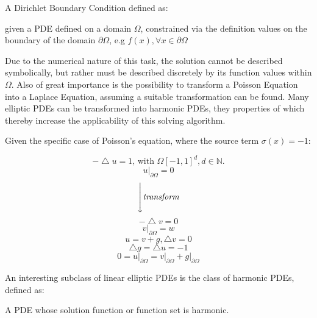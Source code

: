 A Dirichlet Boundary Condition defined as:
\begin{definition}
given a \Gls{PDE}
defined on a domain $\Omega$, constrained via the definition values on the
 boundary of the domain $\partial \Omega$, e.g $f(x), \forall  x \in \partial \Omega$
\end{definition}
Due to the numerical nature of this task, the solution cannot be described symbolically,
but rather must be described discretely by its function values within $\Omega$.
Also of great importance is the possibility to transform a Poisson Equation into
a Laplace Equation, assuming a suitable transformation can be found.   Many elliptic \glspl{PDE} can be transformed into harmonic \glspl{PDE},
they properties of which thereby increase the applicability of this solving algorithm\cite{Bornemann}.
\begin{example}
  Given the specific case of Poisson's equation, where the source term $\sigma(x)=-1$:
  \begin{multicols}{2}
    \begin{equation}
      -\bigtriangleup u = 1\text{, with }\Omega [-1,1]^{d}, d \in \mathbb{N}.
    \end{equation}
      $$u\big\rvert_{\partial \Omega} = 0 $$
    \begin{equation}
      \Bigg\downarrow \textit{transform}
    \end{equation}
    \begin{equation}
      -\bigtriangleup v = 0
    \end{equation}
    $$v\big\rvert_{\partial \Omega} = w$$
    \break
    \begin{equation}
    u = v + g, \bigtriangleup v = 0
    \end{equation}
    \begin{equation}
      \bigtriangleup g = \bigtriangleup u = -1
    \end{equation}
        $$0 = u\big\rvert_{\partial \Omega} = v\big\rvert_{\partial \Omega} + g\big\rvert_{\partial \Omega}$$\break\break
  \end{multicols}
\cite{Bornemann}
\end{example}
An interesting subclass of linear elliptic \Glspl{PDE} is the class of harmonic \Glspl{PDE}, defined as:
\begin{definition}
  A \Gls{PDE} whose solution function or function set is harmonic.
\end{definition}

